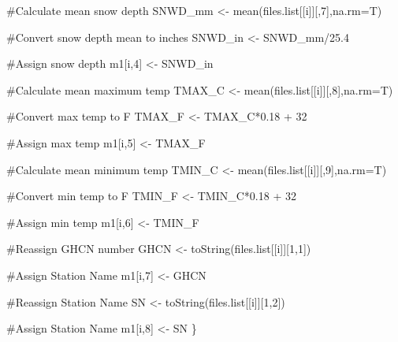 \documentclass[
  letterpaper,
]{book}
\newenvironment{Shaded}{\begin{snugshade}}{\end{snugshade}}
\newcommand{\AttributeTok}[1]{\textcolor[rgb]{0.40,0.45,0.13}{#1}}
\newcommand{\CommentTok}[1]{\textcolor[rgb]{0.37,0.37,0.37}{#1}}
\newcommand{\DecValTok}[1]{\textcolor[rgb]{0.68,0.00,0.00}{#1}}
\newcommand{\FloatTok}[1]{\textcolor[rgb]{0.68,0.00,0.00}{#1}}
\newcommand{\FunctionTok}[1]{\textcolor[rgb]{0.28,0.35,0.67}{#1}}
\newcommand{\NormalTok}[1]{\textcolor[rgb]{0.00,0.23,0.31}{#1}}
\newcommand{\OtherTok}[1]{\textcolor[rgb]{0.00,0.23,0.31}{#1}}
\newcommand{\SpecialCharTok}[1]{\textcolor[rgb]{0.37,0.37,0.37}{#1}}
\begin{document}
\begin{Shaded}
\begin{Highlighting}[]
    \CommentTok{\#Calculate mean snow depth}
\NormalTok{        SNWD\_mm }\OtherTok{\textless{}{-}} \FunctionTok{mean}\NormalTok{(files.list[[i]][,}\DecValTok{7}\NormalTok{],}\AttributeTok{na.rm=}\NormalTok{T)}

    \CommentTok{\#Convert snow depth mean to inches}
\NormalTok{    SNWD\_in }\OtherTok{\textless{}{-}}\NormalTok{ SNWD\_mm}\SpecialCharTok{/}\FloatTok{25.4}

    \CommentTok{\#Assign snow depth}
\NormalTok{    m1[i,}\DecValTok{4}\NormalTok{] }\OtherTok{\textless{}{-}}\NormalTok{ SNWD\_in}

    \CommentTok{\#Calculate mean maximum temp}
\NormalTok{        TMAX\_C }\OtherTok{\textless{}{-}} \FunctionTok{mean}\NormalTok{(files.list[[i]][,}\DecValTok{8}\NormalTok{],}\AttributeTok{na.rm=}\NormalTok{T)}

    \CommentTok{\#Convert max temp to F}
\NormalTok{    TMAX\_F }\OtherTok{\textless{}{-}}\NormalTok{ TMAX\_C}\SpecialCharTok{*}\FloatTok{0.18} \SpecialCharTok{+} \DecValTok{32}
    
    \CommentTok{\#Assign max temp}
\NormalTok{    m1[i,}\DecValTok{5}\NormalTok{] }\OtherTok{\textless{}{-}}\NormalTok{ TMAX\_F}

    \CommentTok{\#Calculate mean minimum temp}
\NormalTok{    TMIN\_C }\OtherTok{\textless{}{-}} \FunctionTok{mean}\NormalTok{(files.list[[i]][,}\DecValTok{9}\NormalTok{],}\AttributeTok{na.rm=}\NormalTok{T)}

    \CommentTok{\#Convert min temp to F}
\NormalTok{    TMIN\_F }\OtherTok{\textless{}{-}}\NormalTok{ TMIN\_C}\SpecialCharTok{*}\FloatTok{0.18} \SpecialCharTok{+} \DecValTok{32}

    \CommentTok{\#Assign min temp}
\NormalTok{    m1[i,}\DecValTok{6}\NormalTok{] }\OtherTok{\textless{}{-}}\NormalTok{ TMIN\_F}

    \CommentTok{\#Reassign GHCN number}
\NormalTok{    GHCN }\OtherTok{\textless{}{-}} \FunctionTok{toString}\NormalTok{(files.list[[i]][}\DecValTok{1}\NormalTok{,}\DecValTok{1}\NormalTok{])}

    \CommentTok{\#Assign Station Name}
\NormalTok{    m1[i,}\DecValTok{7}\NormalTok{] }\OtherTok{\textless{}{-}}\NormalTok{ GHCN}

    \CommentTok{\#Reassign Station Name}
\NormalTok{    SN }\OtherTok{\textless{}{-}} \FunctionTok{toString}\NormalTok{(files.list[[i]][}\DecValTok{1}\NormalTok{,}\DecValTok{2}\NormalTok{])}

    \CommentTok{\#Assign Station Name}
\NormalTok{    m1[i,}\DecValTok{8}\NormalTok{] }\OtherTok{\textless{}{-}}\NormalTok{ SN}
\NormalTok{\}}


\end{Highlighting}
\end{Shaded}
\end{document}
